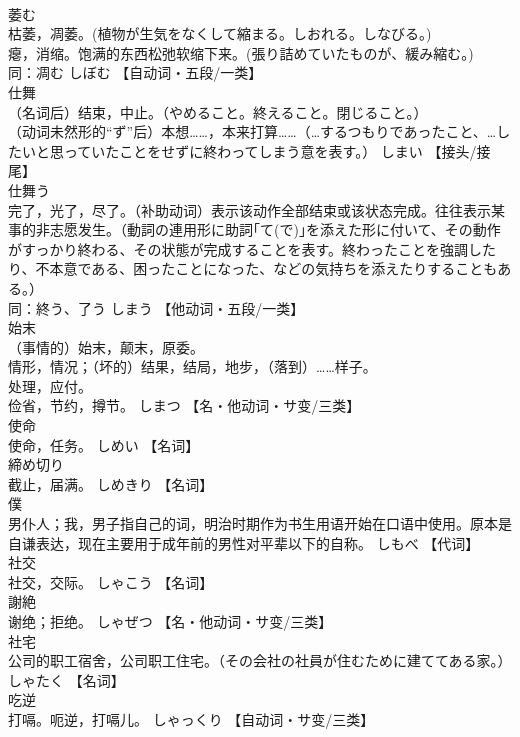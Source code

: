 \documentclass[8pt]{extreport}
\begin{document}
\begin{CJK}{UTF8}{min}
\\	萎む	
\\	枯萎，凋萎。(植物が生気をなくして縮まる。しおれる。しなびる。) 
\\	瘪，消缩。饱满的东西松弛软缩下来。(張り詰めていたものが、緩み縮む。) 
\\	同：凋む	しぼむ		【自动词・五段/一类】
\\	仕舞	
\\	（名词后）结束，中止。（やめること。終えること。閉じること。） 
\\	（动词未然形的“ず”后）本想……，本来打算……（…するつもりであったこと、…したいと思っていたことをせずに終わってしまう意を表す。）	しまい		【接头/接尾】
\\	仕舞う	
\\	完了，光了，尽了。（补助动词）表示该动作全部结束或该状态完成。往往表示某事的非志愿发生。（動詞の連用形に助詞｢て(で)｣を添えた形に付いて、その動作がすっかり終わる、その状態が完成することを表す。終わったことを強調したり、不本意である、困ったことになった、などの気持ちを添えたりすることもある。） 
\\	同：終う、了う	しまう		【他动词・五段/一类】
\\	始末	
\\	（事情的）始末，颠末，原委。 
\\	情形，情况；（坏的）结果，结局，地步，（落到）……样子。 
\\	处理，应付。 
\\	俭省，节约，撙节。	しまつ		【名・他动词・サ变/三类】
\\	使命	
\\	使命，任务。	しめい		【名词】
\\	締め切り	
\\	截止，届满。	しめきり		【名词】
\\	僕	
\\	男仆人；我，男子指自己的词，明治时期作为书生用语开始在口语中使用。原本是自谦表达，现在主要用于成年前的男性对平辈以下的自称。	しもべ		【代词】
\\	社交	
\\	社交，交际。	しゃこう		【名词】
\\	謝絶	
\\	谢绝；拒绝。	しゃぜつ		【名・他动词・サ变/三类】
\\	社宅	
\\	公司的职工宿舍，公司职工住宅。（その会社の社員が住むために建ててある家。）	しゃたく		【名词】
\\	吃逆	
\\	打嗝。呃逆，打嗝儿。	しゃっくり		【自动词・サ变/三类】

\end{CJK}
\end{document}
